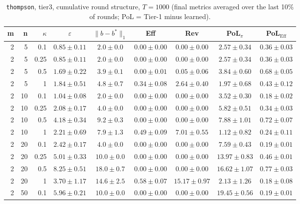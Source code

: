 \begin{table}[htbp]
\centering
\scriptsize
\caption{\texttt{thompson}, tier3, cumulative round structure, $T=1000$ (final metrics averaged over the last 10\% of rounds; PoL = Tier-1 minus learned).}
\label{tab:tier3_thompson_cumulative}
\begin{tabular}{@{}rrrcccccc@{}}
\toprule
m & n & $\kappa$ & $\varepsilon$ & $\|b-b^*\|_1$ & Eff & Rev & PoL$_\pi$ & PoL$_\mathrm{Eff}$ \\
\midrule
2 & 5 & 0.1 & $0.85 \pm 0.11$ & $2.0 \pm 0.0$ & $0.00 \pm 0.00$ & $0.00 \pm 0.00$ & $2.57 \pm 0.34$ & $0.36 \pm 0.03$ \\
2 & 5 & 0.25 & $0.85 \pm 0.11$ & $2.0 \pm 0.0$ & $0.00 \pm 0.00$ & $0.00 \pm 0.00$ & $2.57 \pm 0.34$ & $0.36 \pm 0.03$ \\
2 & 5 & 0.5 & $1.69 \pm 0.22$ & $3.9 \pm 0.1$ & $0.00 \pm 0.01$ & $0.05 \pm 0.06$ & $3.84 \pm 0.60$ & $0.68 \pm 0.05$ \\
2 & 5 & 1 & $1.84 \pm 0.51$ & $4.8 \pm 0.7$ & $0.34 \pm 0.08$ & $2.64 \pm 0.40$ & $1.97 \pm 0.68$ & $0.43 \pm 0.12$ \\
2 & 10 & 0.1 & $1.04 \pm 0.08$ & $2.0 \pm 0.0$ & $0.00 \pm 0.00$ & $0.00 \pm 0.00$ & $3.52 \pm 0.30$ & $0.18 \pm 0.02$ \\
2 & 10 & 0.25 & $2.08 \pm 0.17$ & $4.0 \pm 0.0$ & $0.00 \pm 0.00$ & $0.00 \pm 0.00$ & $5.82 \pm 0.51$ & $0.34 \pm 0.03$ \\
2 & 10 & 0.5 & $4.18 \pm 0.34$ & $9.2 \pm 0.3$ & $0.00 \pm 0.00$ & $0.00 \pm 0.00$ & $7.88 \pm 1.01$ & $0.72 \pm 0.07$ \\
2 & 10 & 1 & $2.21 \pm 0.69$ & $7.9 \pm 1.3$ & $0.49 \pm 0.09$ & $7.01 \pm 0.55$ & $1.12 \pm 0.82$ & $0.24 \pm 0.11$ \\
2 & 20 & 0.1 & $2.42 \pm 0.17$ & $4.0 \pm 0.0$ & $0.00 \pm 0.00$ & $0.00 \pm 0.00$ & $7.59 \pm 0.43$ & $0.19 \pm 0.01$ \\
2 & 20 & 0.25 & $5.01 \pm 0.33$ & $10.0 \pm 0.0$ & $0.00 \pm 0.00$ & $0.00 \pm 0.00$ & $13.97 \pm 0.83$ & $0.46 \pm 0.01$ \\
2 & 20 & 0.5 & $8.25 \pm 0.51$ & $18.0 \pm 0.7$ & $0.00 \pm 0.00$ & $0.00 \pm 0.00$ & $16.62 \pm 1.07$ & $0.77 \pm 0.03$ \\
2 & 20 & 1 & $3.70 \pm 1.17$ & $14.6 \pm 2.5$ & $0.58 \pm 0.07$ & $15.17 \pm 0.97$ & $2.13 \pm 1.26$ & $0.18 \pm 0.08$ \\
2 & 50 & 0.1 & $5.96 \pm 0.21$ & $10.0 \pm 0.0$ & $0.00 \pm 0.00$ & $0.00 \pm 0.00$ & $19.45 \pm 0.56$ & $0.19 \pm 0.01$ \\

\end{tabular}
\end{table}
